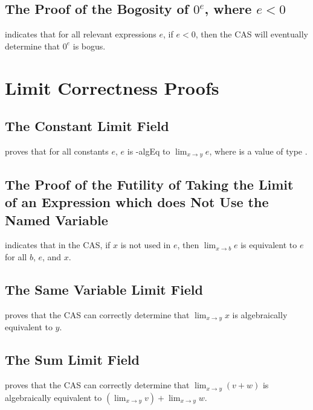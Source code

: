 \documentclass{report}
\begin{document}
\subsection{The Proof of the Bogosity of \(0^e\), where \(e < 0\)}
  indicates that for all relevant expressions \(e\), if \(e < 0\), then the CAS will eventually determine that \(0^e\) is bogus.

\section{Limit Correctness Proofs}

\subsection{The Constant Limit Field}
  proves that for all constants \(e\), \(e\) is -\gls{algEq} to \(\lim_{x \rightarrow y} e\), where  is a value of type  .

\subsection{The Proof of the Futility of Taking the Limit of an Expression which does Not Use the Named Variable}
  indicates that in the  CAS, if \(x\) is not used in \(e\), then \(\lim_{x \rightarrow b} e\) is equivalent to \(e\) for all \(b\), \(e\), and \(x\).

\subsection{The Same Variable Limit Field}
  proves that the  CAS can correctly determine that \(\lim_{x \rightarrow y} x\) is algebraically equivalent to \(y\).

\subsection{The Sum Limit Field}
  proves that the  CAS can correctly determine that \(\lim_{x \rightarrow y} \left(v + w\right)\) is algebraically equivalent to \(\left(\lim_{x \rightarrow y} v\right) + \lim_{x \rightarrow y} w\).
\end{document}
